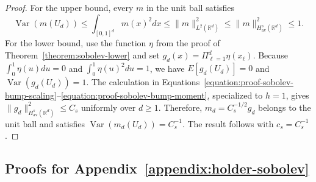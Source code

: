 \documentclass[letterpaper,12pt]{article}
\theoremstyle{definition}
\numberwithin{equation}{section}
\newcommand{\norm}[1]{\lVert#1\rVert}
\DeclareMathOperator{\var}{Var}
\begin{document}
\begin{proof}
For the upper bound, every $m$ in the unit ball satisfies
\begin{equation*}
\var(m(U_d))\leq\int_{[0,1]^d}m(x)^2dx\leq\norm{m}_{L^2(\mathbb R^d)}^2\leq\norm{m}_{H_{\mathrm{av}}^s(\mathbb R^d)}^2\leq1.
\end{equation*}
For the lower bound, use the function $\eta$ from the proof of Theorem~\ref{theorem:sobolev-lower} and set $g_d(x)=\Pi_{\ell=1}^d\eta(x_\ell)$.
Because $\int_0^1\eta(u)du=0$ and $\int_0^1\eta(u)^2du=1$, we have $E[g_d(U_d)]=0$ and $\var(g_d(U_d))=1$.
The calculation in Equations~\eqref{equation:proof-sobolev-bump-scaling}--\eqref{equation:proof-sobolev-bump-moment}, specialized to $h=1$, gives $\norm{g_d}_{H_{\mathrm{av}}^s(\mathbb R^d)}^2\leq C_s$ uniformly over $d\geq1$.
Therefore, $m_d=C_s^{-1/2}g_d$ belongs to the unit ball and satisfies $\var(m_d(U_d))=C_s^{-1}$.
The result follows with $c_s=C_s^{-1}$.
\end{proof}

\subsection{Proofs for Appendix~\ref*{appendix:holder-sobolev}}
\end{document}
